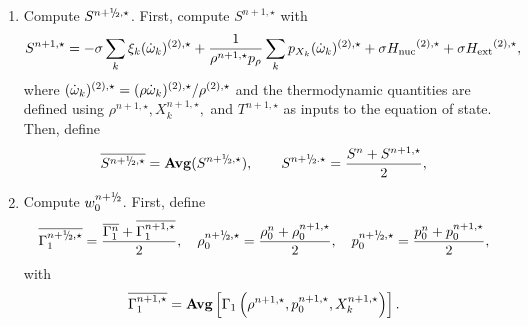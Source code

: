 \begin{description}
\begin{enumerate}
\item Compute $S^{\nph,\star}$.  First, compute $S^{n+1,\star}$ with
\begin{equation}
S^{n+1,\star} =  -\sigma  \sum_k  \xi_k  (\dot{\omega}_k)^{(2),\star}  + \frac{1}{\rho^{n+1,\star} p_\rho} \sum_k p_{X_k}  ({\dot{\omega}}_k)^{(2),\star} + \sigma {H_{\rm nuc}}^{(2),\star} + \sigma {H_{\rm ext}}^{(2),\star},
\end{equation}
  where $(\dot{\omega}_k)^{(2),\star} = (\rho \dot{\omega}_k)^{(2),\star} /
  \rho^{(2),\star}$ and the thermodynamic quantities are defined using
  $\rho^{n+1,\star}, X_k^{n+1,\star},$ and $T^{n+1,\star}$ as inputs to
  the equation of state.  Then, define
\begin{equation}
\overline{S^{\nph,\star}} = {\mathrm{\bf Avg}} (S^{\nph,\star}),
\qquad
 S^{\nph.\star} = \frac{S^n + S^{n+1,\star}}{2},
\end{equation}
\item Compute $w_0^{\nph}$.  First, define
\begin{equation}
\overline{\Gamma_1^{\nph,\star}} = \frac{\overline{\Gamma_1^n} + \overline{\Gamma_1^{n+1,\star}}}{2}, 
\quad
\rho_0^{\nph,\star} = \frac{\rho_0^{n} + \rho_0^{n+1,\star}}{2},
\quad
p_0^{\nph,\star} = \frac{p_0^{n} + p_0^{n+1,\star}}{2},
\end{equation}
  with
\begin{equation}
 \overline{\Gamma_1^{n+1,\star}} = {\rm{\bf Avg}} \left[ \Gamma_1\left(\rho^{n+1,\star}, p_0^{n+1,\star}, X_k^{n+1,\star}\right) \right].
\end{equation}


\end{enumerate}
\end{description}
